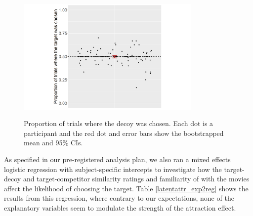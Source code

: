 \documentclass[12pt, a4paper]{article}
\begin{document}
 
\begin{figure}[htb!]
\centering
\captionsetup{justification=centering}
\caption{Proportion of trials where the decoy was chosen. Each dot is a participant and the red dot and error bars show the bootstrapped mean and 95\% CIs.}
\includegraphics[width=0.8\textwidth]{exp2_res.png}
\label{fig:exp2_res}
\end{figure}

As specified in our pre-registered analysis plan, we also ran a mixed effects logistic regression with subject-specific intercepts to investigate how the target-decoy and target-competitor similarity ratings and familiarity of with the movies affect the likelihood of choosing the target. Table \ref{latentattr_exp2reg} shows the results from this regression, where contrary to our expectations, none of the explanatory variables seem to modulate the strength of the attraction effect. 
\end{document}
